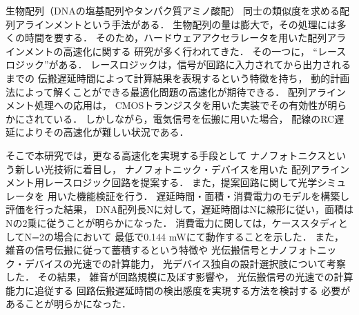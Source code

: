 \documentclass{yokou}
\begin{document}
\begin{contentyokou}
生物配列（DNAの塩基配列やタンパク質アミノ酸配）
同士の類似度を求める配列アラインメントという手法がある．
生物配列の量は膨大で，その処理には多くの時間を要する．
そのため，ハードウェアアクセラレータを用いた配列アラインメントの高速化に関する
研究が多く行われてきた．
その一つに，
``レースロジック”がある．
レースロジックは，信号が回路に入力されてから出力されるまでの
伝搬遅延時間によって計算結果を表現するという特徴を持ち，
動的計画法によって解くことができる最適化問題の高速化が期待できる．
配列アラインメント処理への応用は，
CMOSトランジスタを用いた実装でその有効性が明らかにされている．
しかしながら，電気信号を伝搬に用いた場合，
配線のRC遅延によりその高速化が難しい状況である．

そこで本研究では，更なる高速化を実現する手段として
ナノフォトニクスという新しい光技術に着目し，
ナノフォトニック・デバイスを用いた
配列アラインメント用レースロジック回路を提案する．
また，提案回路に関して光学シミュレータを
用いた機能検証を行う．
遅延時間・面積・消費電力のモデルを構築し
評価を行った結果，
DNA配列長Nに対して，遅延時間はNに線形に従い，面積はNの2乗に従うことが明らかになった．
消費電力に関しては，ケーススタディとしてN=2の場合において
最低で0.144 mWにて動作することを示した．
また，雑音の信号伝搬に従って蓄積するという特徴や
光伝搬信号とナノフォトニック・デバイスの光速での計算能力，
光デバイス独自の設計選択肢について考察した．
その結果，
雑音が回路規模に及ぼす影響や，
光伝搬信号の光速での計算能力に追従する
回路伝搬遅延時間の検出感度を実現する方法を検討する
必要があることが明らかになった．
\end{contentyokou}
\end{document}
